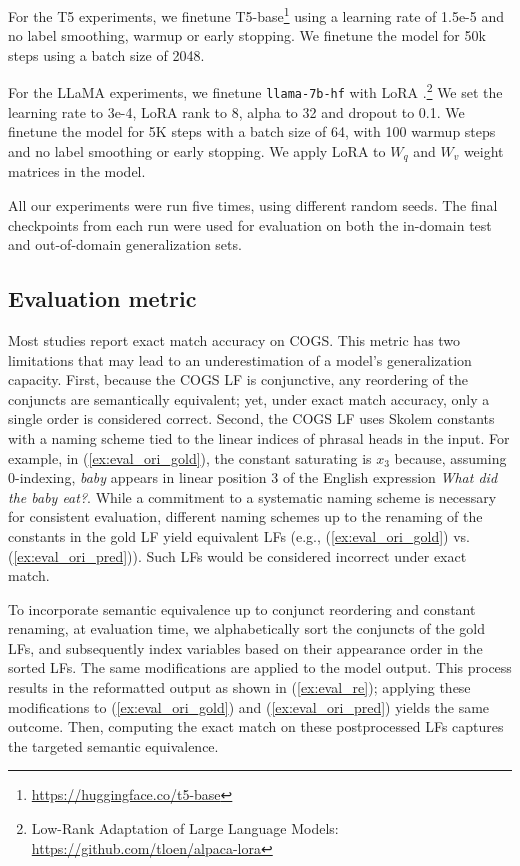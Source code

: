 For the T5 experiments, we finetune T5-base\footnote{\url{https://huggingface.co/t5-base}} using a learning rate of 1.5e-5 and no label smoothing, warmup or early stopping. We finetune the model for 50k steps using a batch size of 2048.

For the LLaMA experiments, we finetune \texttt{llama-7b-hf} with LoRA \cite{hu2021lora}.\footnote{Low-Rank Adaptation of Large Language Models: \url{https://github.com/tloen/alpaca-lora}} We set the learning rate to 3e-4, LoRA rank to 8, alpha to 32 and dropout to 0.1. We finetune the model for 5K steps with a batch size of 64, with 100 warmup steps and no label smoothing or early stopping. We apply LoRA to ${W_q}$ and ${W_v}$ weight matrices in the model.

All our experiments were run five times, using different random seeds. The final checkpoints from each run were used for evaluation on both the in-domain test and out-of-domain generalization sets.

\subsection{Evaluation metric} 

Most studies report exact match accuracy on COGS. This metric has two limitations that may lead to an underestimation of a model's generalization capacity. First, because the COGS LF is conjunctive, any reordering of the conjuncts are semantically equivalent; yet, under exact match accuracy, only a single order is considered correct. Second, the COGS LF uses Skolem constants with a naming scheme tied to the linear indices of phrasal heads in the input. For example, in (\ref{ex:eval_ori_gold}), the constant saturating  is $x_3$ because, assuming 0-indexing, \textit{baby} appears in linear position 3 of the English expression \textit{What did the baby eat?}. While a commitment to a systematic naming scheme is necessary for consistent evaluation, different naming schemes up to the renaming of the constants in the gold LF yield equivalent LFs (e.g., (\ref{ex:eval_ori_gold}) vs. (\ref{ex:eval_ori_pred})). Such LFs would be considered incorrect under exact match.

To incorporate semantic equivalence up to conjunct reordering and constant renaming, at evaluation time, we alphabetically sort the conjuncts of the gold LFs, and subsequently index variables based on their appearance order in the sorted LFs. The same modifications are applied to the model output. This process results in the reformatted output as shown in (\ref{ex:eval_re}); applying these modifications to (\ref{ex:eval_ori_gold}) and (\ref{ex:eval_ori_pred}) yields the same outcome. Then, computing the exact match on these postprocessed LFs captures the targeted semantic equivalence.

